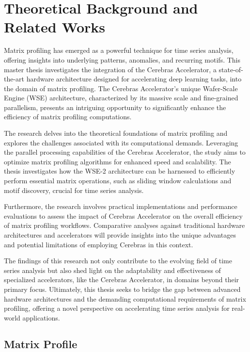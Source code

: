 \chapter{Theoretical Background and Related Works}\label{chapter:theoretical_background}

Matrix profiling has emerged as a powerful technique for time series analysis, offering insights into underlying patterns, anomalies, and recurring motifs. This master thesis investigates the integration of the Cerebras Accelerator, a state-of-the-art hardware architecture designed for accelerating deep learning tasks, into the domain of matrix profiling. The Cerebras Accelerator's unique Wafer-Scale Engine (WSE) architecture, characterized by its massive scale and fine-grained parallelism, presents an intriguing opportunity to significantly enhance the efficiency of matrix profiling computations.

The research delves into the theoretical foundations of matrix profiling and explores the challenges associated with its computational demands. Leveraging the parallel processing capabilities of the Cerebras Accelerator, the study aims to optimize matrix profiling algorithms for enhanced speed and scalability. The thesis investigates how the WSE-2 architecture can be harnessed to efficiently perform essential matrix operations, such as sliding window calculations and motif discovery, crucial for time series analysis.

Furthermore, the research involves practical implementations and performance evaluations to assess the impact of Cerebras Accelerator on the overall efficiency of matrix profiling workflows. Comparative analyses against traditional hardware architectures and accelerators will provide insights into the unique advantages and potential limitations of employing Cerebras in this context.

The findings of this research not only contribute to the evolving field of time series analysis but also shed light on the adaptability and effectiveness of specialized accelerators, like the Cerebras Accelerator, in domains beyond their primary focus. Ultimately, this thesis seeks to bridge the gap between advanced hardware architectures and the demanding computational requirements of matrix profiling, offering a novel perspective on accelerating time series analysis for real-world applications.

\section{Matrix Profile}

